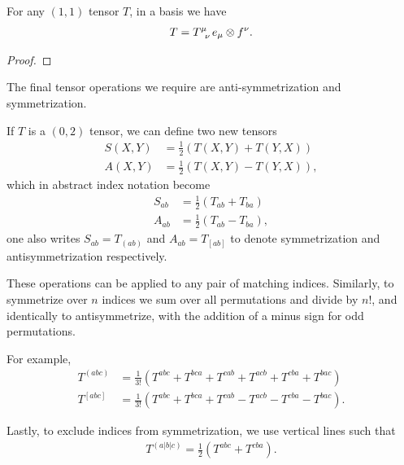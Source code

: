 \begin{exercise}
    For any $\left( 1,1 \right) $ tensor $T$, in a basis we have
    \begin{align}
        T = \tensor{T}{^{\mu}_{\nu}} e_\mu \otimes f^{\nu}
    .\end{align}
\end{exercise}

\begin{proof}
    
\end{proof}

The final tensor operations we require are anti-symmetrization and symmetrization.

\begin{definition}
    If $T$ is a $\left( 0,2 \right) $ tensor, we can define two new tensors
    \begin{align}
        S \left( X,Y \right) &= \frac{1}{2} \left( T\left( X,Y \right) + T \left( Y,X \right)  \right) \\
        A \left( X,Y \right) &= \frac{1}{2} \left( T\left( X,Y \right) - T \left( Y,X \right)  \right)
    ,\end{align}
    which in abstract index notation become
    \begin{align}
        S_{ab} &= \frac{1}{2} \left( T_{ab} + T_{ba} \right) \\
        A_{ab} &= \frac{1}{2} \left( T_{ab} - T_{ba} \right) 
    ,\end{align}
    one also writes $S_{ab} = T_{(ab)}$ and $A_{ab} = T_{[ab]}$ to denote symmetrization and antisymmetrization respectively.
\end{definition}

These operations can be applied to any pair of matching indices. Similarly, to symmetrize over $n$ indices we sum over all permutations and divide by $n!$, and identically to antisymmetrize, with the addition of a minus sign for odd permutations.

For example,
\begin{align}
    T^{(abc)} &= \frac{1}{3!} \left( T^{abc} + T^{bca} + T^{cab} + T^{acb} + T^{cba} + T^{bac} \right)  \\
    T^{[abc]} &= \frac{1}{3!} \left( T^{abc} + T^{bca} + T^{cab} - T^{acb} - T^{cba} - T^{bac} \right) 
.\end{align}

Lastly, to exclude indices from symmetrization, we use vertical lines such that
\begin{align}
    T^{(a|b|c)} = \frac{1}{2} \left( T^{abc} + T^{cba} \right) 
.\end{align}

